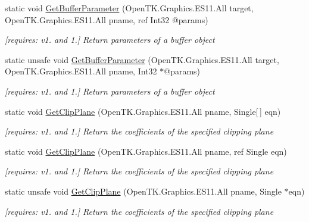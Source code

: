 \begin{DoxyCompactItemize}
static void \hyperlink{class_open_t_k_1_1_graphics_1_1_e_s11_1_1_g_l_a771b9a8a50030a35f7b8c78d02d774e0}{Get\-Buffer\-Parameter} (Open\-T\-K.\-Graphics.\-E\-S11.\-All target, Open\-T\-K.\-Graphics.\-E\-S11.\-All pname, ref Int32 @params)
\begin{DoxyCompactList}\small\item\em \mbox{[}requires\-: v1. and 1.\mbox{]} Return parameters of a buffer object \end{DoxyCompactList}\item 
static unsafe void \hyperlink{class_open_t_k_1_1_graphics_1_1_e_s11_1_1_g_l_a0692b8a06ecae1bf9bb207d93cc938f5}{Get\-Buffer\-Parameter} (Open\-T\-K.\-Graphics.\-E\-S11.\-All target, Open\-T\-K.\-Graphics.\-E\-S11.\-All pname, Int32 $\ast$@params)
\begin{DoxyCompactList}\small\item\em \mbox{[}requires\-: v1. and 1.\mbox{]} Return parameters of a buffer object \end{DoxyCompactList}\item 
static void \hyperlink{class_open_t_k_1_1_graphics_1_1_e_s11_1_1_g_l_a836bcf5a8fdf84977c4596273fa7b355}{Get\-Clip\-Plane} (Open\-T\-K.\-Graphics.\-E\-S11.\-All pname, Single\mbox{[}$\,$\mbox{]} eqn)
\begin{DoxyCompactList}\small\item\em \mbox{[}requires\-: v1. and 1.\mbox{]} Return the coefficients of the specified clipping plane \end{DoxyCompactList}\item 
static void \hyperlink{class_open_t_k_1_1_graphics_1_1_e_s11_1_1_g_l_aa6e8596a8b042fd1a98c3ff122ec3cff}{Get\-Clip\-Plane} (Open\-T\-K.\-Graphics.\-E\-S11.\-All pname, ref Single eqn)
\begin{DoxyCompactList}\small\item\em \mbox{[}requires\-: v1. and 1.\mbox{]} Return the coefficients of the specified clipping plane \end{DoxyCompactList}\item 
static unsafe void \hyperlink{class_open_t_k_1_1_graphics_1_1_e_s11_1_1_g_l_a1e9f05795f7525c4be160b1085952177}{Get\-Clip\-Plane} (Open\-T\-K.\-Graphics.\-E\-S11.\-All pname, Single $\ast$eqn)
\begin{DoxyCompactList}\small\item\em \mbox{[}requires\-: v1. and 1.\mbox{]} Return the coefficients of the specified clipping plane \end{DoxyCompactList}\item 

\end{DoxyCompactItemize}
